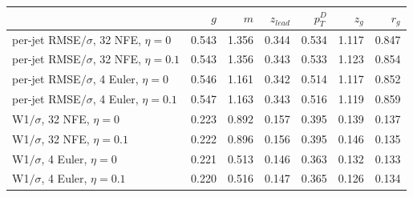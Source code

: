 \scriptsize
\begin{tabular}{lrrrrrr}
\toprule
 & $g$ & $m$ & $z_{lead}$ & $p_T^D$ & $z_g$ & $r_g$ \\
\midrule
per-jet RMSE$/\sigma$, 32 NFE, $\eta = 0$ & 0.543 & 1.356 & 0.344 & 0.534 & 1.117 & 0.847 \\
per-jet RMSE$/\sigma$, 32 NFE, $\eta = 0.1$ & 0.543 & 1.356 & 0.343 & 0.533 & 1.123 & 0.854 \\
per-jet RMSE$/\sigma$, 4 Euler, $\eta = 0$ & 0.546 & 1.161 & 0.342 & 0.514 & 1.117 & 0.852 \\
per-jet RMSE$/\sigma$, 4 Euler, $\eta = 0.1$ & 0.547 & 1.163 & 0.343 & 0.516 & 1.119 & 0.859 \\
\midrule
W1$/\sigma$, 32 NFE, $\eta = 0$ & 0.223 & 0.892 & 0.157 & 0.395 & 0.139 & 0.137 \\
W1$/\sigma$, 32 NFE, $\eta = 0.1$ & 0.222 & 0.896 & 0.156 & 0.395 & 0.146 & 0.135 \\
W1$/\sigma$, 4 Euler, $\eta = 0$ & 0.221 & 0.513 & 0.146 & 0.363 & 0.132 & 0.133 \\
W1$/\sigma$, 4 Euler, $\eta = 0.1$ & 0.220 & 0.516 & 0.147 & 0.365 & 0.126 & 0.134 \\
\bottomrule
\end{tabular}
